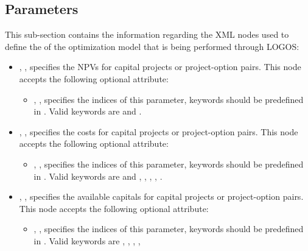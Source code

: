%
\subsection{Parameters}
\label{subsec:Parameters}
This sub-section contains the information regarding the XML nodes used to define the
 of the optimization model that is being performed through LOGOS:
\begin{itemize}
  \item {}, ,
  specifies the NPVs for capital projects or project-option pairs. This node accepts the
  following optional attribute:
  \begin{itemize}
    \item {}, ,
    specifies the indices of this parameter, keywords should be predefined in .
    Valid keywords are  and .
  \end{itemize}
  \item {}, ,
  specifies the costs for capital projects or project-option pairs. This node accepts the
  following optional attribute:
  \begin{itemize}
    \item {}, ,
    specifies the indices of this parameter, keywords should be predefined in .
    Valid keywords are  and ,
    , , ,
    .
  \end{itemize}
  \item {}, ,
  specifies the available capitals for capital projects or project-option pairs.
  This node accepts the following optional attribute:
  \begin{itemize}
    \item {}, ,
    specifies the indices of this parameter, keywords should be predefined in .
    Valid keywords are , , ,
    , 
  \end{itemize}
\end{itemize}

